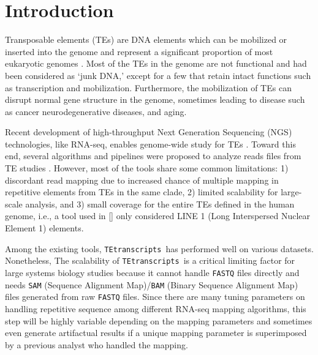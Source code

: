\documentclass[wsdraft]{ws-procs11x85}
\newcommand{\TEtranscripts}{\texttt{TEtranscripts}}
\begin{document}
\bodymatter

\section{Introduction}\label{aba:intro}

Transposable elements (TEs) are DNA elements which can be mobilized or inserted into the genome and represent a significant proportion of most eukaryotic genomes \cite{erwin2014mobile}. 
Most of the TEs in the genome are not functional and had been considered as `junk DNA,' except for a few that retain intact functions such as transcription and mobilization.\cite{biemont2006genetics}
Furthermore, the mobilization of TEs can disrupt normal gene structure in the genome, sometimes leading to disease such as cancer \cite{belancio2008mammalian,jirtle2007environmental} neurodegenerative diseases,\cite{erwin2014mobile} and aging.\cite{wood2013chromatin} 

Recent development of high-throughput Next Generation Sequencing (NGS) technologies, like RNA-seq, enables genome-wide study for TEs \cite{ohtani2013dmgtsf1,mihevc2016tdp,li2012transposable,krug2017retrotransposon}. Toward this end, several algorithms and pipelines were proposed to analyze reads files from TE studies \cite{lee2012landscape,platzer2012te,helman2014somatic,henaff2015jitterbug,jin2015tetranscripts,de2017identifying,tang2017human}. However, most of the tools share some common limitations: 1) discordant read mapping due to increased chance of multiple mapping in repetitive elements from TEs in the same clade, 2) limited scalability for large-scale analysis, and 3) small coverage for the entire TEs defined in the human genome, i.e., a tool used in [] only considered LINE 1 (Long Interspersed Nuclear Element 1) elements.\cite{ewing2015transposable} 

Among the existing tools, \TEtranscripts~has performed well on various datasets.\cite{jin2015tetranscripts}
Nonetheless, The scalability of \TEtranscripts~is a critical limiting factor for large systems biology studies because it cannot handle \verb|FASTQ| files directly and needs \verb|SAM| (Sequence Alignment Map)/\verb|BAM| (Binary Sequence Alignment Map) files generated from raw \verb|FASTQ| files. Since there are many tuning parameters on handling repetitive sequence among different RNA-seq mapping algorithms, this step will be highly variable depending on the mapping parameters and sometimes even generate artifactual results if a unique mapping parameter is superimposed by a previous analyst who handled the mapping. 
\end{document}
